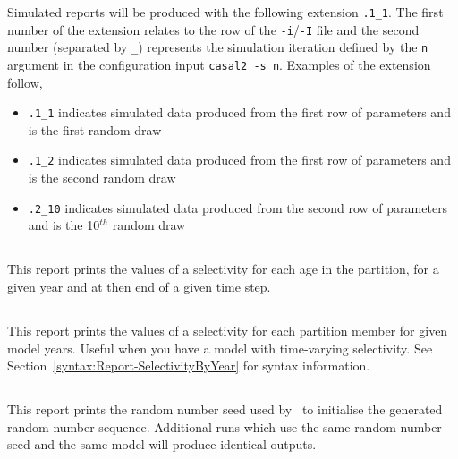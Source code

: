 Simulated reports will be produced with the following extension \texttt{.1\_1}. The first number of the extension relates to the row of the \texttt{-i}/\texttt{-I} file and the second number (separated by \texttt{\_}) represents the simulation iteration defined by the \texttt{n} argument in the configuration input \texttt{casal2 -s n}. Examples of the extension follow,
\begin{itemize}
	\item \texttt{.1\_1} indicates simulated data produced from the first row of parameters and is the first random draw
	\item \texttt{.1\_2} indicates simulated data produced from the first row of parameters and is the second random draw
	\item \texttt{.2\_10} indicates simulated data produced from the second row of parameters and is the 10\(^{th}\) random draw
\end{itemize}
\subsection{}\label{sec:Report-Selectivity}

This report prints the values of a selectivity for each age in the partition, for a given year and at then end of a given time step.

\subsection{}\label{sec:Report-SelectivityByYear}

This report prints the values of a selectivity for each partition member for given model years. Useful when you have a model with time-varying selectivity. See Section~\ref{syntax:Report-SelectivityByYear} for syntax information.


\subsection{}\label{sec:Report-RandomNumberSeed}

This report prints the random number seed used by \CNAME\ to initialise the generated random number sequence. Additional runs which use the same random number seed and the same model will produce identical outputs.

